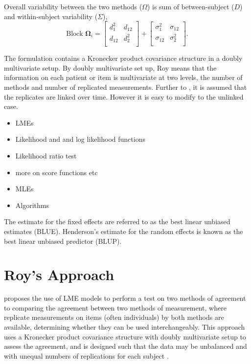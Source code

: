 \documentclass[12pt, a4paper]{report}
\theoremstyle{plain}
\theoremstyle{definition}
\theoremstyle{remark}
\begin{document}
Overall variability between the two methods ($\Omega$) is sum of between-subject ($D$) and within-subject variability ($\Sigma$),
\[
\mbox{Block } \boldsymbol{\Omega}_i = \left[ \begin{array}{cc} d^2_1 & d_{12}\\ d_{12} & d^2_2\\ \end{array} \right]
+ \left[\begin{array}{cc} \sigma^2_1 & \sigma_{12}\\ \sigma_{12} & \sigma^2_2\\ \end{array}\right].
\]
\bigskip



The formulation contains a Kronecker product covariance structure in a doubly multivariate setup. By doubly multivariate set up, Roy means that the information on each patient or item is multivariate at two levels, the number of methods and number of replicated measurements. Further to \citet{lam}, it is assumed that the replicates are linked over time. However it is easy to modify to the unlinked case.


\begin{itemize}
	\item LMEs
	\item Likelihood and and log likelihood functions
	\item Likelihood ratio test
	\item more on score functions etc
	\item MLEs
	\item Algorithms
	
\end{itemize}

The estimate for the fixed effects are referred to as the best linear unbiased estimates (BLUE). Henderson's estimate for the random effects is known as the best linear unbiased predictor (BLUP).


\section{Roy's Approach}
\citet{ARoy2009} proposes the use of LME models to perform a test on two methods of agreement to comparing the agreement between two methods of measurement, where replicate measurements on items (often individuals) by both methods are available, determining whether they can be used
interchangeably. This approach uses a Kronecker product covariance structure with doubly multivariate setup to
assess the agreement, and is designed such that the data may be unbalanced and with unequal numbers of replications for each subject \citep{ARoy2009}.
\end{document}
